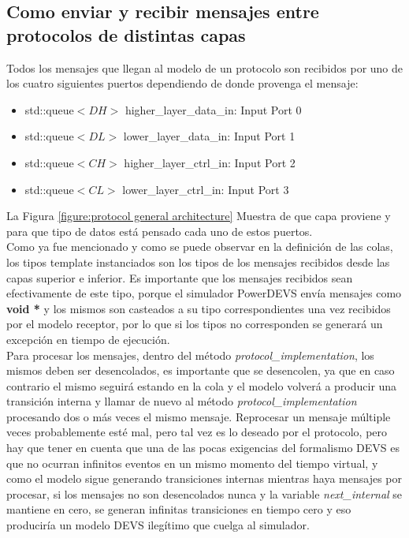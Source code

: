 \documentclass[10pt,a4paper]{article}
\begin{document}
\newpage

\subsection{Como enviar y recibir mensajes entre protocolos de distintas capas}

Todos los mensajes que llegan al modelo de un protocolo son recibidos por uno de los cuatro siguientes puertos dependiendo de donde provenga el mensaje:
\begin{itemize}
\item std::queue$<DH>$ higher\_layer\_data\_in:  Input Port 0
\item std::queue$<DL>$ lower\_layer\_data\_in:   Input Port 1
\item std::queue$<CH>$ higher\_layer\_ctrl\_in:  Input Port 2 
\item std::queue$<CL>$ lower\_layer\_ctrl\_in:   Input Port 3
\end{itemize}

La Figura \ref{figure:protocol general architecture} Muestra de que capa proviene y para que tipo de datos está pensado cada uno de estos puertos. \\

Como ya fue mencionado y como se puede observar en la definición de las colas, los tipos template instanciados son los tipos de los mensajes recibidos desde las capas superior e inferior. Es importante que los mensajes recibidos sean efectivamente de este tipo, porque el simulador PowerDEVS envía mensajes como \textbf{void *} y los mismos son casteados a su tipo correspondientes una vez recibidos por el modelo receptor, por lo que si los tipos no corresponden se generará un excepción en tiempo de ejecución. \\

Para procesar los mensajes, dentro del método \textit{protocol\_implementation}, los mismos deben ser desencolados, es importante que se desencolen, ya que en caso contrario el mismo seguirá estando en la cola y el modelo volverá a producir una transición interna y llamar de nuevo al método \textit{protocol\_implementation} procesando dos o más veces el mismo mensaje. Reprocesar un mensaje múltiple veces probablemente esté mal, pero tal vez es lo deseado por el protocolo, pero hay que tener en cuenta que una de las pocas exigencias del formalismo DEVS es que no ocurran infinitos eventos en un mismo momento del tiempo virtual, y como el modelo sigue generando transiciones internas mientras haya mensajes por procesar, si los mensajes no son desencolados nunca y la variable \textit{next\_internal} se mantiene en cero, se generan infinitas transiciones en tiempo cero y eso produciría un modelo DEVS ilegítimo que cuelga al simulador. \\
\end{document}
